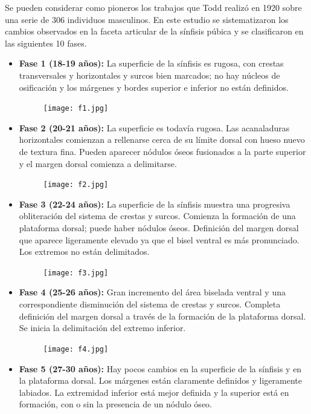 \documentclass[a4paper,11pt]{article}
\begin{document}
Se pueden considerar como pioneros los trabajos que Todd realizó en 1920 sobre una serie de 306 individuos masculinos. En este estudio se sistematizaron los cambios observados en la faceta articular de la sínfisis púbica y se clasificaron en las siguientes 10 fases.
\begin{itemize}
\item {\bf Fase 1 (18-19 años):} La superficie de la sínfisis es rugosa, con crestas transversales y horizontales y surcos bien marcados; no hay núcleos de osificación y los márgenes y bordes superior e inferior no están definidos.
\begin{figure}[h!]
\centering
\texttt{[image: f1.jpg]}
\end{figure}
\item {\bf Fase 2 (20-21 años):} La superficie es todavía rugosa. Las acanaladuras horizontales comienzan a rellenarse cerca de su límite dorsal con hueso nuevo de textura fina. Pueden aparecer nódulos óseos fusionados a la parte superior y el margen dorsal comienza a delimitarse.
\begin{figure}[h!]
\centering
\texttt{[image: f2.jpg]}
\end{figure}
\item {\bf Fase 3 (22-24 años):} La superficie de la sínfisis muestra una progresiva obliteración del sistema de crestas y surcos. Comienza la formación de una plataforma dorsal; puede haber nódulos óseos. Definición del margen dorsal que aparece ligeramente elevado ya que el bisel ventral es más pronunciado. Los extremos no están delimitados.
\begin{figure}[h!]
\centering
\texttt{[image: f3.jpg]}
\end{figure}
\item {\bf Fase 4 (25-26 años):} Gran incremento del área biselada ventral y una correspondiente disminución del sistema de crestas y surcos. Completa definición del margen dorsal a través de la formación de la plataforma dorsal. Se inicia la delimitación del extremo inferior.
\begin{figure}[h!]
\centering
\texttt{[image: f4.jpg]}
\end{figure}
\item {\bf Fase 5 (27-30 años):} Hay pocos cambios en la superficie de la sínfisis y en la plataforma dorsal. Los márgenes están claramente definidos y ligeramente labiados. La extremidad inferior está mejor definida y la superior está en formación, con o sin la presencia de un nódulo óseo.
\begin{figure}[h!]

\end{figure}
\end{itemize}
\end{document}
